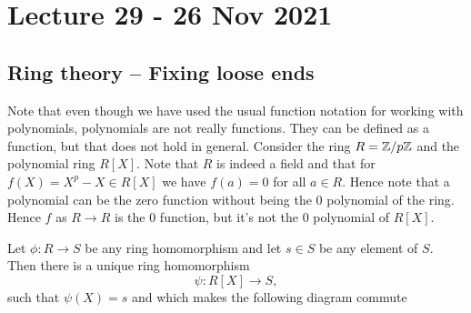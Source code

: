 \section{Lecture 29 - 26 Nov 2021}
\subsection{Ring theory -- Fixing loose ends}
Note that even though we have used the usual function notation for working with
polynomials, polynomials are not really functions. They can be defined as a function, but
that does not hold in general. Consider the ring $R=\mathbb Z/p\mathbb Z$ and  the polynomial ring
$R[X]$. Note that $R$ is indeed a field and that for $f(X)=X^p-X\in R[X]$ we have $f(a)=0$
for all $a\in R$. Hence note that a polynomial can be the zero function without being the
$0$ polynomial of the ring. Hence $f$ as $R\to R$ is the $0$ function, but it's not the
$0$ polynomial of $R[X]$.

\begin{theorem}
Let $\phi: R \longrightarrow S$ be any ring homomorphism and let $s \in S$ be any element of $S$. Then there is a unique ring homomorphism
$$
\psi: R[X] \longrightarrow S,
$$
such that $\psi(X)=s$ and which makes the following diagram commute
\begin{center}
\end{center}
\end{theorem}

